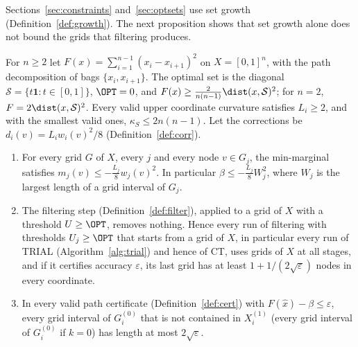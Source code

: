 Sections~\ref{sec:constraints} and~\ref{sec:optsets} use set growth
(Definition~\ref{def:growth}). The next proposition shows that set growth
alone does not bound the grids that filtering produces.

\begin{proposition}\label{lim:prop:setgrowth}
For $n\ge2$ let $F(x)=\sum_{i=1}^{n-1}(x_i-x_{i+1})^2$ on $X=[0,1]^n$, with
the path decomposition of bags $\{x_i,x_{i+1}\}$. The optimal set is the
diagonal $\mathcal S=\{t\mathbf1:t\in[0,1]\}$, $\OPT=0$, and
$F(x)\ge\frac2{n(n-1)}\dist(x,\mathcal S)^2$; for $n=2$,
$F=2\dist(x,\mathcal S)^2$. Every valid upper coordinate curvature satisfies
$L_i\ge2$, and with the smallest valid ones, $\kappa_S\le2n(n-1)$. Let the
corrections be $d_i(v)=L_iw_i(v)^2/8$ (Definition~\ref{def:corr}).
\begin{enumerate}[label=(\alph*)]
\item For every grid $G$ of $X$, every $j$ and every node $v\in G_j$, the
  min-marginal satisfies $m_j(v)\le-\frac{L_j}8w_j(v)^2$. In particular
  $\beta\le-\frac{L_j}8W_j^2$, where $W_j$ is the largest length of a grid
  interval of $G_j$.
\item The filtering step (Definition~\ref{def:filter}), applied to a grid
  of $X$ with a threshold $U\ge\OPT$, removes nothing. Hence every run of
  filtering with thresholds $U_j\ge\OPT$ that starts from a grid of $X$, in
  particular every run of TRIAL (Algorithm~\ref{alg:trial}) and hence of CT,
  uses grids of $X$ at all stages, and if it certifies accuracy
  $\varepsilon$, its last grid has at least $1+1/(2\sqrt\varepsilon)$ nodes
  in every coordinate.
\item In every valid path certificate (Definition~\ref{def:cert}) with
  $F(\hat x)-\beta\le\varepsilon$, every grid interval of $G^{(0)}_i$ that is
  not contained in $X^{(1)}_i$ (every grid interval of $G^{(0)}_i$ if $k=0$)
  has length at most $2\sqrt\varepsilon$.
\end{enumerate}
\end{proposition}

